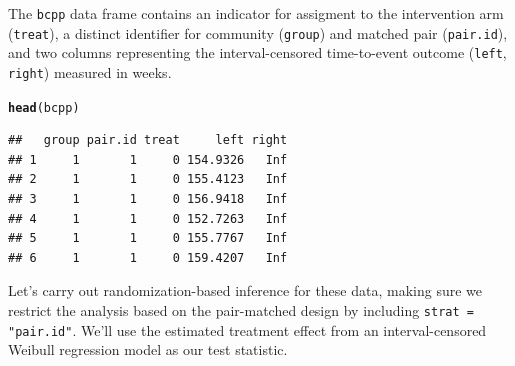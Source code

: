 \documentclass[12pt]{article}\usepackage[]{graphicx}\usepackage[]{color}
\makeatletter
\newcommand{\hlstd}[1]{\textcolor[rgb]{0.345,0.345,0.345}{#1}}%
\newcommand{\hlkwd}[1]{\textcolor[rgb]{0.737,0.353,0.396}{\textbf{#1}}}%
\newenvironment{kframe}{%
 \def\at@end@of@kframe{}%
 \ifinner\ifhmode%
  \def\at@end@of@kframe{\end{minipage}}%
  \begin{minipage}{\columnwidth}%
 \fi\fi%
 \def\FrameCommand##1{\hskip\@totalleftmargin \hskip-\fboxsep
 \colorbox{shadecolor}{##1}\hskip-\fboxsep
     \hskip-\linewidth \hskip-\@totalleftmargin \hskip\columnwidth}%
 \MakeFramed {\advance\hsize-\width
   \@totalleftmargin\z@ \linewidth\hsize
   \@setminipage}}%
 {\par\unskip\endMakeFramed%
 \at@end@of@kframe}
\newenvironment{knitrout}{}{} %
\makeatother
\begin{document}
The \texttt{bcpp} data frame contains an indicator for assigment to the intervention arm (\texttt{treat}), a distinct identifier for community (\texttt{group}) and matched pair (\texttt{pair.id}), and two columns representing the interval-censored time-to-event outcome (\texttt{left}, \texttt{right}) measured in weeks.
\begin{knitrout}
\color{fgcolor}\begin{kframe}
\begin{alltt}
\hlkwd{head}\hlstd{(bcpp)}
\end{alltt}
\begin{verbatim}
##   group pair.id treat     left right
## 1     1       1     0 154.9326   Inf
## 2     1       1     0 155.4123   Inf
## 3     1       1     0 156.9418   Inf
## 4     1       1     0 152.7263   Inf
## 5     1       1     0 155.7767   Inf
## 6     1       1     0 159.4207   Inf
\end{verbatim}
\end{kframe}
\end{knitrout}
Let's carry out randomization-based inference for these data, making sure we restrict the analysis based on the pair-matched design by including \texttt{strat = "pair.id"}. We'll use the estimated treatment effect from an interval-censored Weibull regression model as our test statistic.
\end{document}
